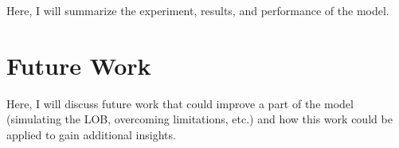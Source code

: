 Here, I will summarize the experiment, results, and performance of the model.
\section{Future Work}
Here, I will discuss future work that could improve a part of the model (simulating the LOB, overcoming limitations, etc.) and how this work could be applied to gain additional insights.